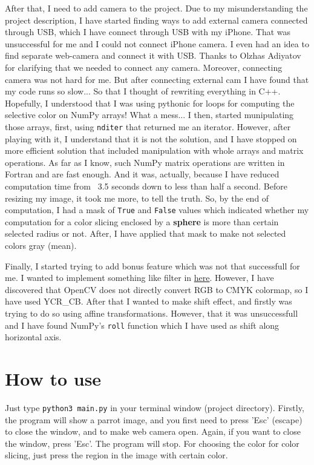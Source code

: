 \documentclass{IEEEtran}
\begin{document}
After that, I need to add camera to the project. Due to my misunderstanding the project description, I have started finding ways to add external camera connected through USB, which I have connect through USB with my iPhone. That was unsuccessful for me and I could not connect iPhone camera. I even had an idea to find separate web-camera and connect it with USB. Thanks to Olzhas Adiyatov for clarifying that we needed to connect any camera. Moreover, connecting camera was not hard for me. But after connecting external cam I have found that my code runs so slow... So that I thought of rewriting everything in C++. Hopefully, I understood that I was using pythonic for loops for computing the selective color on NumPy arrays! What a mess... I then, started munipulating those arrays, first, using \texttt{nditer} that returned me an iterator. However, after playing with it, I understand that it is not the solution, and I have stopped on more efficient solution that included manipulation with whole arrays and matrix operations. As far as I know, such NumPy matrix operations are written in Fortran and are fast enough. And it was, actually, because I have reduced computation time from ~3.5 seconds down to less than half a second. Before resizing my image, it took me more, to tell the truth. So, by the end of computation, I had a mask of \texttt{True} and \texttt{False} values which indicated whether my computation for a color slicing enclosed by a \textbf{sphere} is more than certain selected radius or not. After, I have applied that mask to make not selected colors gray (mean).

Finally, I started trying to add bonus feature which was not that successfull for me. I wanted to implement something like filter in \href{https://www.skillshare.com/classes/Creative-Image-Making-Layered-Color-Effect-Using-Channels-in-Photoshop/1938759291}{here}. However, I have discovered that OpenCV does not directly convert RGB to CMYK colormap, so I have used YCR{\_}CB. After that I wanted to make shift effect, and firstly was trying to do so using affine transformations. However, that it was unsuccessfull and I have found NumPy's \texttt{roll} function which I have used as shift along horizontal axis.

\section{How to use}
Just type \texttt{python3 main.py} in your terminal window (project directory). Firstly, the program will show a parrot image, and you first need to press 'Esc' (escape) to close the window, and to make web camera open. Again, if you want to close the window, press 'Esc'. The program will stop. For choosing the color for color slicing, just press the region in the image with certain color.
\end{document}
